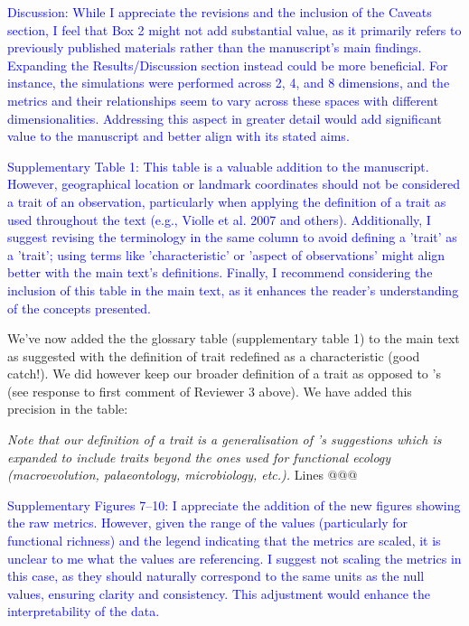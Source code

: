 \documentclass[
]{article}
\begin{document}

\textcolor{blue}{Discussion: While I appreciate the revisions and the inclusion of the Caveats section, I feel that Box 2 might not add substantial value, as it primarily refers to previously published materials rather than the manuscript's main findings.
Expanding the Results/Discussion section instead could be more beneficial.
For instance, the simulations were performed across 2, 4, and 8 dimensions, and the metrics and their relationships seem to vary across these spaces with different dimensionalities.
Addressing this aspect in greater detail would add significant value to the manuscript and better align with its stated aims.}


\textcolor{blue}{Supplementary Table 1: This table is a valuable addition to the manuscript.
However, geographical location or landmark coordinates should not be considered a trait of an observation, particularly when applying the definition of a trait as used throughout the text (e.g., Violle et al. 2007 and others).
Additionally, I suggest revising the terminology in the same column to avoid defining a 'trait' as a 'trait'; using terms like 'characteristic' or 'aspect of observations' might align better with the main text's definitions.
Finally, I recommend considering the inclusion of this table in the main text, as it enhances the reader's understanding of the concepts presented.}

We've now added the the glossary table (supplementary table 1) to the main text as suggested with the definition of trait redefined as a characteristic (good catch!).
We did however keep our broader definition of a trait as opposed to \cite{violle2007let}'s (see response to first comment of Reviewer 3 above).
We have added this precision in the table:

\textit{Note that our definition of a trait is a generalisation of \cite{violle2007let,mcgill2006rebuilding,dawson2021traits}'s suggestions which is expanded to include traits beyond the ones used for functional ecology (macroevolution, palaeontology, microbiology, etc.).} Lines @@@

\textcolor{blue}{Supplementary Figures 7–10: I appreciate the addition of the new figures showing the raw metrics.
However, given the range of the values (particularly for functional richness) and the legend indicating that the metrics are scaled, it is unclear to me what the values are referencing.
I suggest not scaling the metrics in this case, as they should naturally correspond to the same units as the null values, ensuring clarity and consistency.
This adjustment would enhance the interpretability of the data.}
\end{document}
